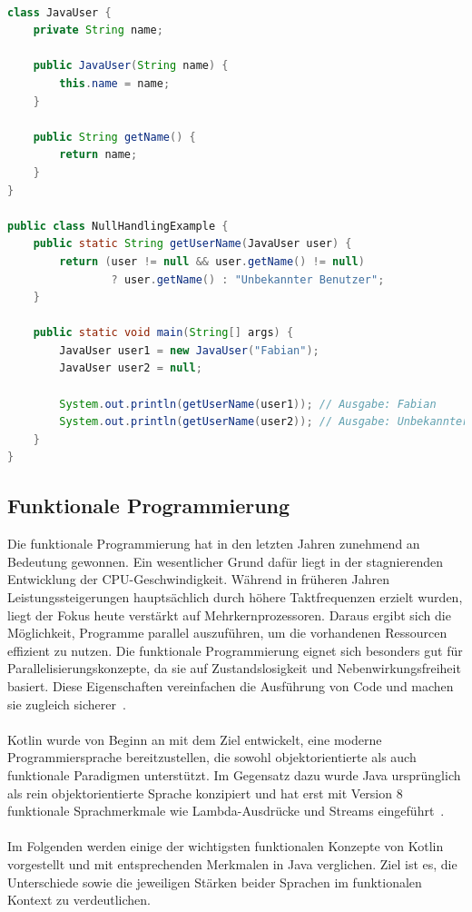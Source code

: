 \documentclass[11pt]{article}
\begin{document}
    \begin{lstlisting}[language=Java, caption={NullHandlingExample.java}, label={lst:java-user-null-safety}]

class JavaUser {
    private String name;

    public JavaUser(String name) {
        this.name = name;
    }

    public String getName() {
        return name;
    }
}

public class NullHandlingExample {
    public static String getUserName(JavaUser user) {
        return (user != null && user.getName() != null)
                ? user.getName() : "Unbekannter Benutzer";
    }

    public static void main(String[] args) {
        JavaUser user1 = new JavaUser("Fabian");
        JavaUser user2 = null;

        System.out.println(getUserName(user1)); // Ausgabe: Fabian
        System.out.println(getUserName(user2)); // Ausgabe: Unbekannter Benutzer
    }
}
    \end{lstlisting}

    \subsection{Funktionale Programmierung}

    Die funktionale Programmierung hat in den letzten Jahren zunehmend an Bedeutung gewonnen.
    Ein wesentlicher Grund dafür liegt in der stagnierenden Entwicklung der CPU-Geschwindigkeit.
    Während in früheren Jahren Leistungssteigerungen hauptsächlich durch höhere Taktfrequenzen erzielt wurden, liegt der Fokus heute verstärkt auf Mehrkernprozessoren.
    Daraus ergibt sich die Möglichkeit, Programme parallel auszuführen, um die vorhandenen Ressourcen effizient zu nutzen.
    Die funktionale Programmierung eignet sich besonders gut für Parallelisierungskonzepte, da sie auf Zustandslosigkeit und Nebenwirkungsfreiheit basiert.
    Diese Eigenschaften vereinfachen die Ausführung von Code und machen sie zugleich sicherer~\cite[129]{kotlin-patterns}.\\
    \\
    Kotlin wurde von Beginn an mit dem Ziel entwickelt, eine moderne Programmiersprache bereitzustellen, die sowohl objektorientierte als auch funktionale Paradigmen unterstützt.
    Im Gegensatz dazu wurde Java ursprünglich als rein objektorientierte Sprache konzipiert und hat erst mit Version 8 funktionale Sprachmerkmale wie Lambda-Ausdrücke und Streams eingeführt~\cite[54]{insel}.\\
    \\
    Im Folgenden werden einige der wichtigsten funktionalen Konzepte von Kotlin vorgestellt und mit entsprechenden Merkmalen in Java verglichen.
    Ziel ist es, die Unterschiede sowie die jeweiligen Stärken beider Sprachen im funktionalen Kontext zu verdeutlichen.
\end{document}
